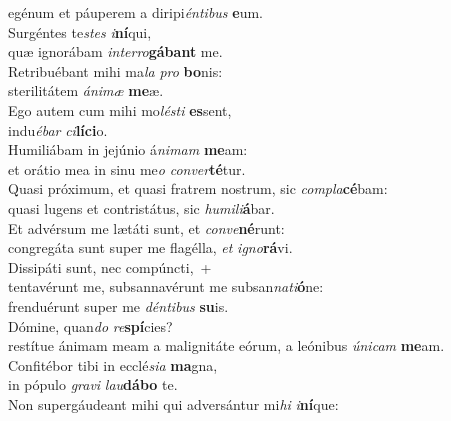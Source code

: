 \evenverse egénum et páuperem a diripi\textit{én}\textit{ti}\textit{bus} \textbf{e}um.\\
\oddverse Surgéntes te\textit{stes} \textit{i}\textbf{ní}qui,~\*\\
\oddverse quæ ignorábam \textit{in}\textit{ter}\textit{ro}\textbf{gá}\textbf{bant} me.\\
\evenverse Retribuébant mihi ma\textit{la} \textit{pro} \textbf{bo}nis:~\*\\
\evenverse sterilitátem \textit{á}\textit{ni}\textit{mæ} \textbf{me}æ.\\
\oddverse Ego autem cum mihi mo\textit{lé}\textit{sti} \textbf{es}sent,~\*\\
\oddverse indu\textit{é}\textit{bar} \textit{ci}\textbf{lí}\textbf{ci}o.\\
\evenverse Humiliábam in jejúnio á\textit{ni}\textit{mam} \textbf{me}am:~\*\\
\evenverse et orátio mea in sinu me\textit{o} \textit{con}\textit{ver}\textbf{té}tur.\\
\oddverse Quasi próximum, et quasi fratrem nostrum, sic \textit{com}\textit{pla}\textbf{cé}bam:~\*\\
\oddverse quasi lugens et contristátus, sic \textit{hu}\textit{mi}\textit{li}\textbf{á}bar.\\
\evenverse Et advérsum me lætáti sunt, et \textit{con}\textit{ve}\textbf{né}runt:~\*\\
\evenverse congregáta sunt super me flagélla, \textit{et} \textit{i}\textit{gno}\textbf{rá}vi.\\
\oddverse Dissipáti sunt, nec compúncti,~+\\
\oddverse  tentavérunt me, subsannavérunt me subsan\textit{na}\textit{ti}\textbf{ó}ne:~\*\\
\oddverse frenduérunt super me \textit{dén}\textit{ti}\textit{bus} \textbf{su}is.\\
\evenverse Dómine, quan\textit{do} \textit{re}\textbf{spí}cies?~\*\\
\evenverse restítue ánimam meam a malignitáte eórum, a leónibus \textit{ú}\textit{ni}\textit{cam} \textbf{me}am.\\
\oddverse Confitébor tibi in ecclé\textit{si}\textit{a} \textbf{ma}gna,~\*\\
\oddverse in pópulo \textit{gra}\textit{vi} \textit{lau}\textbf{dá}\textbf{bo} te.\\
\evenverse Non supergáudeant mihi qui adversántur mi\textit{hi} \textit{i}\textbf{ní}que:~\*\\

